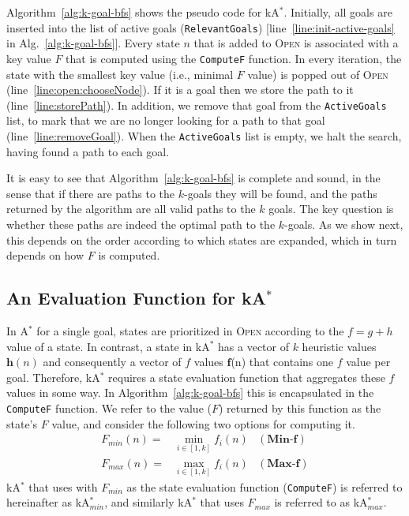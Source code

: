 \documentclass{aicom2e}
\newcommand{\astar}{A$^*$}
\newcommand{\kastar}{kA$^*$}
\newcommand{\kastarmin}{kA$^*_{min}$}
\newcommand{\kastarmax}{kA$^*_{max}$}
\newcommand{\minf}{Min-f}
\newcommand{\maxf}{Max-f}
\newcommand{\open}{\textsc{Open}}
\begin{document}
Algorithm~\ref{alg:k-goal-bfs} shows the pseudo code for \kastar{}. Initially, all goals are inserted into the list of active goals ({\tt RelevantGoals}) [line~\ref{line:init-active-goals} in Alg.~\ref{alg:k-goal-bfs}].  
Every state $n$ that is added to \open{} is associated with a key value $F$ that is computed using the {\tt ComputeF} function. In every iteration, the state with the smallest key value (i.e., minimal $F$ value) is popped out of \open{} (line~\ref{line:open:chooseNode}). If it is a goal then we store the path to it (line~\ref{line:storePath}). In addition, we remove that goal from the {\tt ActiveGoals} list, to mark that we are no longer looking for a path to that goal (line~\ref{line:removeGoal}). When the {\tt ActiveGoals} list is empty, we halt the search, having found a path to each goal. 


It is easy to see that Algorithm~\ref{alg:k-goal-bfs} is complete and sound, in the sense that if there are paths to the $k$-goals they will be found, and the paths returned by the algorithm are all valid paths to the $k$ goals. The key question is whether these paths are indeed the optimal path to the $k$-goals.
As we show next, this depends on the order according to which states are expanded, 
which in turn depends on how $F$ is computed. %


\subsection{An Evaluation Function for \kastar{}}
In \astar{} for a single goal, states are prioritized in \open{} according to the $f=g+h$ value of a state. 
In contrast, a state in \kastar{} has a vector of $k$ heuristic values $\textbf{h}(n)$ and 
consequently a vector of $f$ values $\textbf{f}$(n) that contains one $f$ value per goal. Therefore, \kastar{} requires a state evaluation function that aggregates these $f$ values in some way. In Algorithm~\ref{alg:k-goal-bfs} this is encapsulated in the {\tt ComputeF} function. We refer to the value ($F$) returned by this function as the state's $F$ value, and consider the following two options for computing it. 
\begin{align}
F_{min}(n)=&\min_{i\in [1,k]}f_i(n) & (\textbf{\minf})\\ 
F_{max}(n)=&\max_{i\in [1,k]}f_i(n) & (\textbf{\maxf}) 
\end{align}
\kastar{} that uses with $F_{min}$ as the state evaluation function ({\tt ComputeF}) 
is referred to hereinafter as \kastarmin{}, and similarly \kastar{} that uses $F_{max}$ is referred to 
as \kastarmax{}.
 
\end{document}
